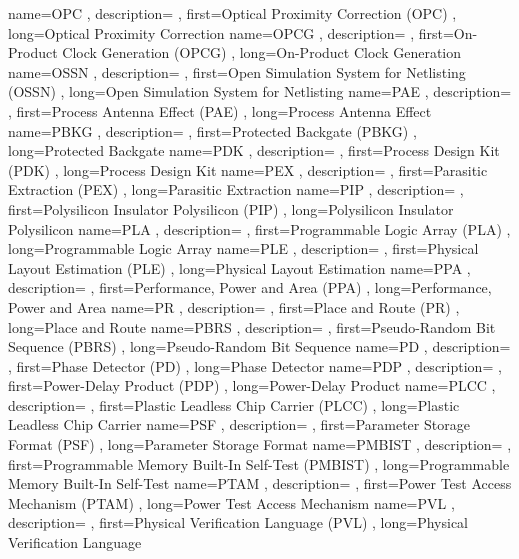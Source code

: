 { name={OPC}
, description={}
, first={Optical Proximity Correction (OPC)}
, long={Optical Proximity Correction}
}
{ name={OPCG}
, description={}
, first={On-Product Clock Generation (OPCG)}
, long={On-Product Clock Generation}
}
{ name={OSSN}
, description={}
, first={Open Simulation System for Netlisting (OSSN)}
, long={Open Simulation System for Netlisting}
}
{ name={PAE}
, description={}
, first={Process Antenna Effect (PAE)}
, long={Process Antenna Effect}
}
{ name={PBKG}
, description={}
, first={Protected Backgate (PBKG)}
, long={Protected Backgate}
}
{ name={PDK}
, description={}
, first={Process Design Kit (PDK)}
, long={Process Design Kit}
}
{ name={PEX}
, description={}
, first={Parasitic Extraction (PEX)}
, long={Parasitic Extraction}
}
{ name={PIP}
, description={}
, first={Polysilicon Insulator Polysilicon (PIP)}
, long={Polysilicon Insulator Polysilicon}
}
{ name={PLA}
, description={}
, first={Programmable Logic Array (PLA)}
, long={Programmable Logic Array}
}
{ name={PLE}
, description={}
, first={Physical Layout Estimation (PLE)}
, long={Physical Layout Estimation}
}
{ name={PPA}
, description={}
, first={Performance, Power and Area (PPA)}
, long={Performance, Power and Area}
}
{ name={PR}
, description={}
, first={Place and Route (PR)}
, long={Place and Route}
}
{ name={PBRS}
, description={}
, first={Pseudo-Random Bit Sequence (PBRS)}
, long={Pseudo-Random Bit Sequence}
}
{ name={PD}
, description={}
, first={Phase Detector (PD)}
, long={Phase Detector}
}
{ name={PDP}
, description={}
, first={Power-Delay Product (PDP)}
, long={Power-Delay Product}
}
{ name={PLCC}
, description={}
, first={Plastic Leadless Chip Carrier (PLCC)}
, long={Plastic Leadless Chip Carrier}
}
{ name={PSF}
, description={}
, first={Parameter Storage Format (PSF)}
, long={Parameter Storage Format}
}
{ name={PMBIST}
, description={}
, first={Programmable Memory Built-In Self-Test (PMBIST)}
, long={Programmable Memory Built-In Self-Test}
}
{ name={PTAM}
, description={}
, first={Power Test Access Mechanism (PTAM)}
, long={Power Test Access Mechanism}
}
{ name={PVL}
, description={}
, first={Physical Verification Language (PVL)}
, long={Physical Verification Language}
}
